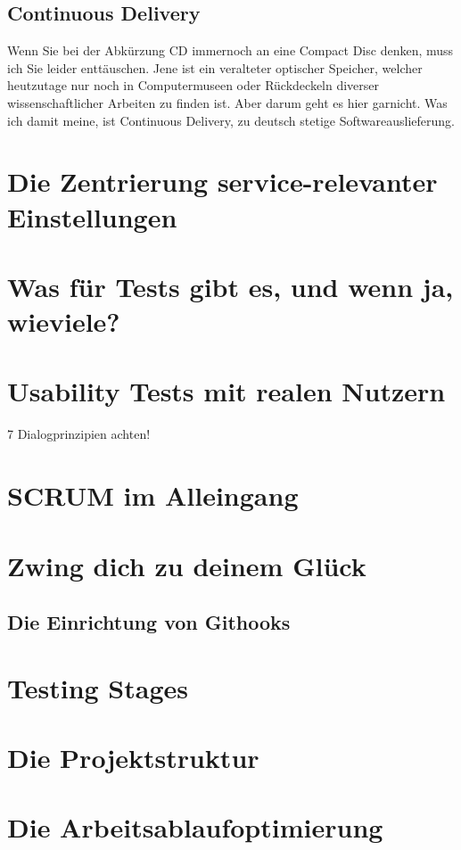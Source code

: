 \subsection{Continuous Delivery}
\label{subsec:continuous-delivery}
Wenn Sie bei der Abkürzung CD immernoch an eine Compact Disc denken, muss ich Sie leider enttäuschen. Jene ist ein veralteter optischer Speicher, welcher heutzutage nur noch in Computermuseen oder Rückdeckeln diverser wissenschaftlicher Arbeiten zu finden ist. Aber darum geht es hier garnicht. Was ich damit meine, ist Continuous Delivery, zu deutsch stetige Softwareauslieferung.


\section{Die Zentrierung service-relevanter Einstellungen}

\section{Was für Tests gibt es, und wenn ja, wieviele?}

\section{Usability Tests mit realen Nutzern}
7 Dialogprinzipien achten!
\section{SCRUM im Alleingang}

\section{Zwing dich zu deinem Glück}

\subsection{Die Einrichtung von Githooks}
\section{Testing Stages}

\section{Die Projektstruktur}

\section{Die Arbeitsablaufoptimierung}

